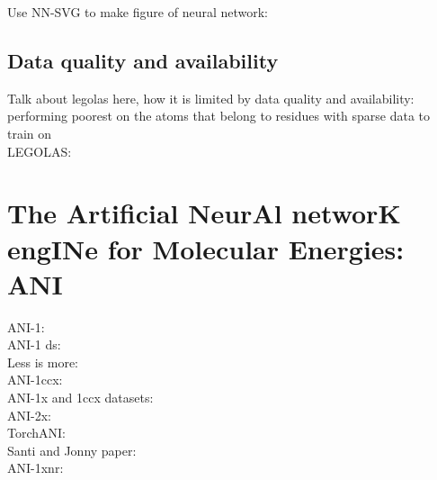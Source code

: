 Use NN-SVG to make figure of neural network: \cite{NN_SVG}

\subsection{Data quality and availability}

Talk about legolas here, how it is limited by data quality and availability: performing poorest on the atoms that belong to residues with sparse data to train on
\\
LEGOLAS: \cite{legolas}\\










\section{The Artificial NeurAl networK engINe for Molecular Energies: ANI}

ANI-1: \cite{ani-1}\\
ANI-1 ds: \cite{ani-1_dataset}\\
Less is more: \cite{ani-1x}\\
ANI-1ccx: \cite{ani-1ccx}\\
ANI-1x and 1ccx datasets: \cite{1x_1ccx_datasets}\\
ANI-2x: \cite{ani-2x}\\
TorchANI: \cite{torchani}\\
Santi and Jonny paper: \cite{ml_mm_santi_y_jonny}\\
ANI-1xnr: \cite{ani-1xnr}\\


